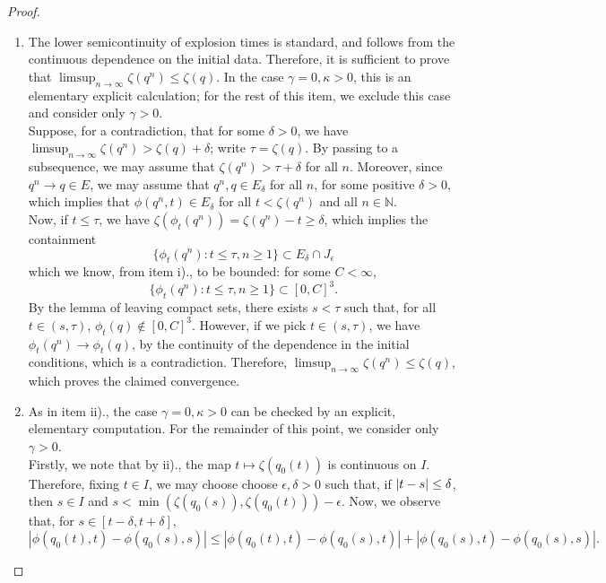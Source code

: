 \begin{proof}
\begin{enumerate}[label=\roman{*}).]
    \item The lower semicontinuity of explosion times is standard, and follows from the continuous dependence on the initial data. Therefore, it is sufficient to prove that $\limsup_{n\rightarrow \infty} \zeta(q^n)\le \zeta(q).$ In the case $\gamma=0, \kappa>0$, this is an elementary explicit calculation; for the rest of this item, we exclude this case and consider only $\gamma>0.$ \medskip \\ Suppose, for a contradiction, that for some $\delta>0$, we have $\limsup_{n\rightarrow \infty} \zeta(q^n)>\zeta(q)+\delta$; write $\tau=\zeta(q)$. By passing to a subsequence, we may assume that $\zeta(q^n)>\tau+\delta$ for all $n$. Moreover, since $q^n\rightarrow q \in E$, we may assume that $q^n, q \in E_\delta$ for all $n$, for some positive $\delta>0$, which implies that $\phi(q^n,t)\in E_\delta$ for all $t<\zeta(q^n)$ and all $n\in \mathbb{N}$.\medskip\\  Now, if $t\le \tau$, we have $\zeta(\phi_t(q^n))=\zeta(q^n)-t \ge \delta$, which implies the containment \begin{equation} \{\phi_t(q^n): t\le \tau, n\ge 1\} \subset E_\delta\cap J_\epsilon \end{equation} which we know, from item i)., to be bounded: for some $C<\infty$, \begin{equation}
        \{\phi_t(q^n): t\le \tau, n\ge 1\} \subset [0,C]^3.
    \end{equation} By the lemma of leaving compact sets, there exists $s<\tau$ such that, for all $t\in (s,\tau)$, $\phi_t(q)\not \in [0,C]^3.$ However, if we pick $t\in (s,\tau)$, we have $\phi_t(q^n) \rightarrow \phi_t(q)$, by the continuity of the dependence in the initial conditions, which is a contradiction. Therefore, $\limsup_{n\rightarrow \infty} \zeta(q^n)\le \zeta(q)$, which proves the claimed convergence.      
    \item As in item ii)., the case $\gamma=0, \kappa>0$ can be checked by an explicit, elementary computation. For the remainder of this point, we consider only $\gamma>0$. \medskip \\ Firstly, we note that by ii)., the map $t\mapsto \zeta(q_0(t))$ is continuous on $I$. Therefore, fixing $t\in I$, we may choose choose  $\epsilon, \delta > 0$ such that, if $\left\lvert{t-s}\right\rvert \le \delta$, then $s\in I$ and $s < \min \left(\zeta\left(q_0(s)\right), \zeta\left(q_0(t)\right)\right)-\epsilon$. Now, we observe that, for $s\in [t-\delta, t+\delta],$\begin{equation}
    |\phi(q_0(t),t)-\phi(q_0(s), s)|\le|\phi(q_0(t),t)-\phi(q_0(s), t)|+|\phi(q_0(s),t)-\phi(q_0(s), s)|.

\end{equation}
\end{enumerate}
\end{proof}

